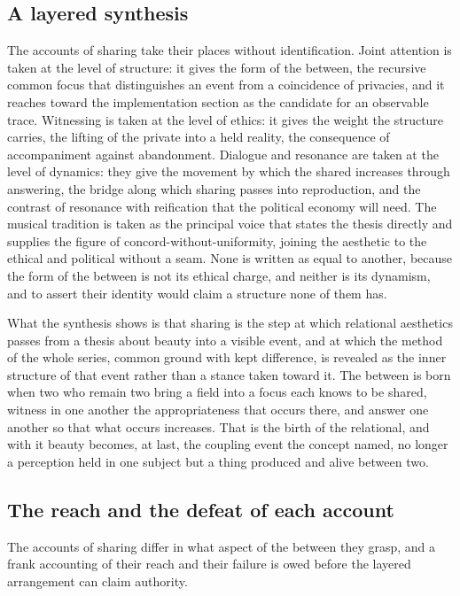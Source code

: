 \subsection{A layered synthesis}
\label{p22:sub:sharing-synthesis}

The accounts of sharing take their places without identification. Joint attention is taken at the level of structure: it gives the form of the between, the recursive common focus that distinguishes an event from a coincidence of privacies, and it reaches toward the implementation section as the candidate for an observable trace. Witnessing is taken at the level of ethics: it gives the weight the structure carries, the lifting of the private into a held reality, the consequence of accompaniment against abandonment. Dialogue and resonance are taken at the level of dynamics: they give the movement by which the shared increases through answering, the bridge along which sharing passes into reproduction, and the contrast of resonance with reification that the political economy will need. The musical tradition is taken as the principal voice that states the thesis directly and supplies the figure of concord-without-uniformity, joining the aesthetic to the ethical and political without a seam. None is written as equal to another, because the form of the between is not its ethical charge, and neither is its dynamism, and to assert their identity would claim a structure none of them has.

What the synthesis shows is that sharing is the step at which relational aesthetics passes from a thesis about beauty into a visible event, and at which the method of the whole series, common ground with kept difference, is revealed as the inner structure of that event rather than a stance taken toward it. The between is born when two who remain two bring a field into a focus each knows to be shared, witness in one another the appropriateness that occurs there, and answer one another so that what occurs increases. That is the birth of the relational, and with it beauty becomes, at last, the coupling event the concept named, no longer a perception held in one subject but a thing produced and alive between two.

\subsection{The reach and the defeat of each account}
\label{p22:sub:sharing-ledger}

The accounts of sharing differ in what aspect of the between they grasp, and a frank accounting of their reach and their failure is owed before the layered arrangement can claim authority.

